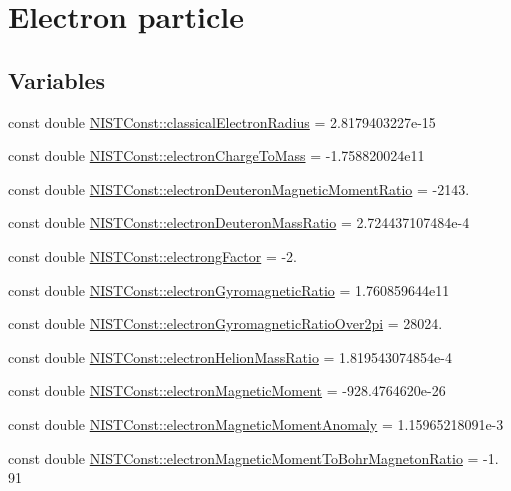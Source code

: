 \hypertarget{group___electron}{}\section{Electron particle}
\label{group___electron}
\subsection*{Variables}
\begin{DoxyCompactItemize}
\item 
const double \hyperlink{group___electron_gac67d6a01d8d75cb66290a36f7123942b}{N\+I\+S\+T\+Const\+::classical\+Electron\+Radius} = 2.\+8179403227e-\/15
\item 
const double \hyperlink{group___electron_ga941e6299b6ef4b90cc525c335d9989dc}{N\+I\+S\+T\+Const\+::electron\+Charge\+To\+Mass} = -\/1.\+758820024e11
\item 
const double \hyperlink{group___electron_ga3dea53b57010903586a46d81a49fc80f}{N\+I\+S\+T\+Const\+::electron\+Deuteron\+Magnetic\+Moment\+Ratio} = -\/2143.
\item 
const double \hyperlink{group___electron_gad526d455579237804ce6194b50782c0e}{N\+I\+S\+T\+Const\+::electron\+Deuteron\+Mass\+Ratio} = 2.\+724437107484e-\/4
\item 
const double \hyperlink{group___electron_ga65a20f263f8ef8f324ea6d1879050a66}{N\+I\+S\+T\+Const\+::electrong\+Factor} = -\/2.
\item 
const double \hyperlink{group___electron_ga7c738b9078ca0308ee45d3b8bbafadb6}{N\+I\+S\+T\+Const\+::electron\+Gyromagnetic\+Ratio} = 1.\+760859644e11
\item 
const double \hyperlink{group___electron_ga67e6ebbd2c2d8043cbdb09979dc7247b}{N\+I\+S\+T\+Const\+::electron\+Gyromagnetic\+Ratio\+Over2pi} = 28024.
\item 
const double \hyperlink{group___electron_ga5039598cd8a51d15d9dfbb0463c109d6}{N\+I\+S\+T\+Const\+::electron\+Helion\+Mass\+Ratio} = 1.\+819543074854e-\/4
\item 
const double \hyperlink{group___electron_ga81fc83bd665b7b4fb83e9901ed7d6628}{N\+I\+S\+T\+Const\+::electron\+Magnetic\+Moment} = -\/928.\+4764620e-\/26
\item 
const double \hyperlink{group___electron_gaf1a0633191464e7a695240858b9b407c}{N\+I\+S\+T\+Const\+::electron\+Magnetic\+Moment\+Anomaly} = 1.\+15965218091e-\/3
\item 
const double \hyperlink{group___electron_ga921889f482e157189bf19818e428532f}{N\+I\+S\+T\+Const\+::electron\+Magnetic\+Moment\+To\+Bohr\+Magneton\+Ratio} = -\/1. 91

\end{DoxyCompactItemize}
